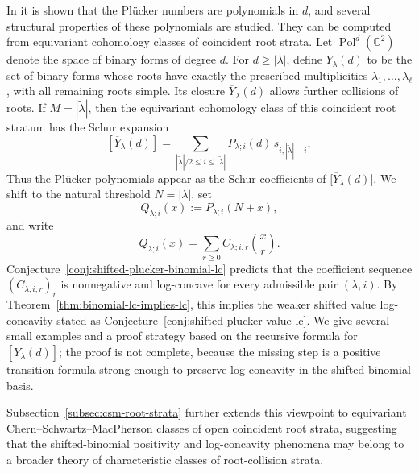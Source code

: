 \documentclass[11pt]{amsart}
\numberwithin{equation}{section}
\theoremstyle{remark}
\DeclareMathOperator{\Pol}{Pol}
\begin{document}
In \cite{feher2023plucker} it is shown that the Pl\"ucker numbers are
polynomials in $d$, and several structural properties of these
polynomials are studied.  They can be computed from equivariant cohomology
classes of coincident root strata.  Let $\Pol^d(\mathbb C^2)$ denote the
space of binary forms of degree $d$.  For $d\ge |\lambda|$, define
$Y_\lambda(d)$ to be the set of 
binary forms whose roots have exactly the prescribed multiplicities
$\lambda_1,\ldots,\lambda_\ell$, with all remaining roots simple.  Its
closure $\overline Y_\lambda(d)$ allows further collisions of roots. If $M=|\tilde\lambda|$, then the equivariant cohomology class of this
coincident root stratum has the Schur expansion
\begin{equation}\label{plucker}
    [\overline Y_\lambda(d)]
  =
  \sum_{|\tilde\lambda|/2 \le i \le |\tilde\lambda|}P_{\lambda;i}(d)\,s_{i,|\tilde\lambda|-i},
\end{equation}
Thus the Pl\"ucker polynomials appear as the Schur coefficients of
$\bigl[\overline Y_\lambda(d)\bigr]$.
We shift to the natural threshold $N=|\lambda|$, set
\[
  Q_{\lambda;i}(x):=P_{\lambda;i}(N+x),
\]
and write
\[
  Q_{\lambda;i}(x)=\sum_{r\ge0} C_{\lambda;i,r}\binom xr.
\]
Conjecture~\ref{conj:shifted-plucker-binomial-lc} predicts that the
coefficient sequence $(C_{\lambda;i,r})_r$ is nonnegative and
log-concave for every admissible pair $(\lambda,i)$.  By
Theorem~\ref{thm:binomial-lc-implies-lc}, this implies the weaker shifted
value log-concavity stated as
Conjecture~\ref{conj:shifted-plucker-value-lc}.  We give several small
examples and a proof strategy based on the recursive formula for
$[\overline Y_\lambda(d)]$; the proof is not complete, because the
missing step is a positive transition formula strong enough to preserve
log-concavity in the shifted binomial basis.

Subsection~\ref{subsec:csm-root-strata} further extends this viewpoint to equivariant
Chern--Schwartz--MacPherson classes of open coincident root strata, suggesting
that the shifted-binomial positivity and log-concavity phenomena may belong to
a broader theory of characteristic classes of root-collision strata.
\end{document}
